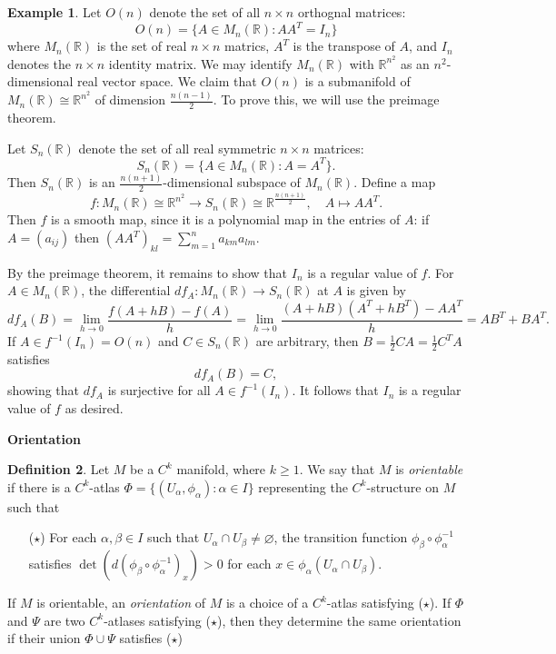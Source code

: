\documentclass{amsart}
\numberwithin{equation}{section}
\newcommand{\bR}{\mathbb{R}}
\theoremstyle{definition}
\newtheorem{definition}{Definition} [section]
\newtheorem{example}[definition]{Example}
\theoremstyle{theorem}
\begin{document}
\begin{example}\label{ex:orthogonal}
Let $O(n)$ denote the set of all $n\times n$ orthognal matrices: 
$$
O(n)=\{ A\in M_n(\bR): AA^T = I_n\}
$$
where $M_n(\bR)$ is the set of real $n\times n$ matrics, $A^T$ is the transpose of $A$, 
and $I_n$ denotes the $n\times n$ identity matrix. We may identify $M_n(\bR)$ with $\bR^{n^2}$ as an
$n^2$-dimensional real vector space. We claim that $O(n)$ is a submanifold of $M_n(\bR)\cong \bR^{n^2}$ of dimension $\frac{n(n-1)}{2}$. 
To prove this, we will use the preimage theorem. 

Let $S_n(\bR)$ denote the set of all real symmetric $n\times n$ matrices:
$$
S_n(\bR)=\{ A\in M_n(\bR):A=A^T\}.
$$ 
Then $S_n(\bR)$ is an $\frac{n(n+1)}{2}$-dimensional
subspace of $M_n(\bR)$. Define a map 
$$
f : M_n(\bR)\cong \bR^{n^2} \longrightarrow S_n(\bR)\cong \bR^{\frac{n(n+1)}{2}},\quad  A \mapsto AA^T.
$$ 
Then $f$ is a smooth map, since it is a polynomial map in the entries of $A$:
if $A=(a_{ij})$ then $(AA^T)_{kl}= \sum_{m=1}^n a_{km}a_{lm}$. 

By the preimage theorem, it remains to show that $I_n$ is a regular value of $f$. 
For $A \in M_n(\mathbb{R})$, the differential $df_A: M_n(\bR)\to S_n(\bR)$
at $A$ is given by 
\[
df_A(B) = \lim_{h \to 0} \frac{f(A + hB) - f(A)}{h} = 
\lim_{h\to 0} \frac{(A+hB)(A^T+hB^T)-AA^T}{h}=  AB^T + BA^T.
\]
If $A \in f^{-1}(I_n)= O(n)$ and $C \in S_n(\mathbb{R})$ are arbitrary, then $B = \tfrac{1}{2}CA =\tfrac{1}{2}C^TA$ satisfies 
\[
df_A(B) = C,
\]
showing that $df_A$ is surjective for all $A\in f^{-1}(I_n)$. It follows that $I_n$ is a regular value 
of $f$ as desired. 
\end{example}

\noindent
{\large \bf Orientation}

\begin{definition}
Let $M$ be a $C^k$ manifold, where $k\geq 1$.  
We say that $M$ is {\em orientable} if there is a $C^k$-atlas $\Phi = \{(U_\alpha, \phi_\alpha) : \alpha \in I\}$ representing the $C^k$-structure on $M$ such that 
\begin{itemize}
\item[($\star$)] For each $\alpha, \beta \in I$ such that $U_\alpha \cap U_\beta \ne \varnothing$, the transition function $\phi_\beta \circ \phi_\alpha^{-1}$ satisfies $\det(d(\phi_\beta \circ \phi_\alpha^{-1})_x) >0$ for each $x \in \phi_\alpha(U_\alpha \cap U_\beta)$.  
\end{itemize}
If $M$ is orientable, an {\em orientation} of $M$ is a choice of a $C^k$-atlas satisfying ($\star$). 
If $\Phi$ and $\Psi$ are two $C^k$-atlases satisfying ($\star$), then they determine the same orientation if their union $\Phi\cup \Psi$ 
satisfies ($\star$)
\end{definition}
\end{document}
